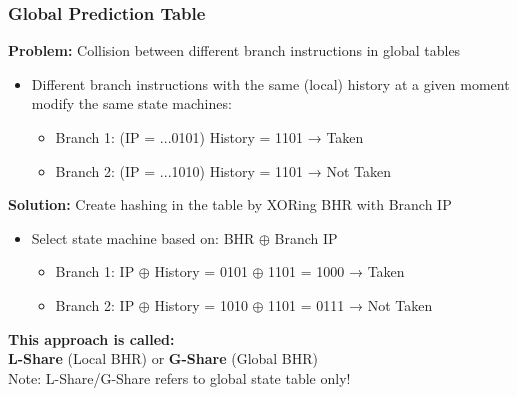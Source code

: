 \documentclass[aspectratio=169,12pt]{beamer}
\begin{document}
\begin{frame}
  \frametitle{Global Prediction Table}
  
  \textbf{Problem:} Collision between different branch instructions in global tables
  
  \begin{itemize}
    \item Different branch instructions with the same (local) history at a given moment modify the same state machines:
    \begin{itemize}
      \item Branch 1: (IP = ...0101) History = 1101 → Taken
      \item Branch 2: (IP = ...1010) History = 1101 → Not Taken
    \end{itemize}
  \end{itemize}
  
  \vspace{0.5em}
  
  \textbf{Solution:} Create hashing in the table by XORing BHR with Branch IP
  \begin{itemize}
    \item Select state machine based on: BHR $\oplus$ Branch IP
    \begin{itemize}
      \item Branch 1: IP $\oplus$ History = 0101 $\oplus$ 1101 = 1000 → Taken
      \item Branch 2: IP $\oplus$ History = 1010 $\oplus$ 1101 = 0111 → Not Taken
    \end{itemize}
  \end{itemize}
  
  \vspace{0.5em}
  
  \begin{tcolorbox}[colback=blue!10, colframe=blue!50]
    \centering
    \textbf{This approach is called:}\\
    \textbf{L-Share} (Local BHR) or \textbf{G-Share} (Global BHR)\\
    \small Note: L-Share/G-Share refers to global state table only!
  \end{tcolorbox}
\end{frame}
\end{document}
